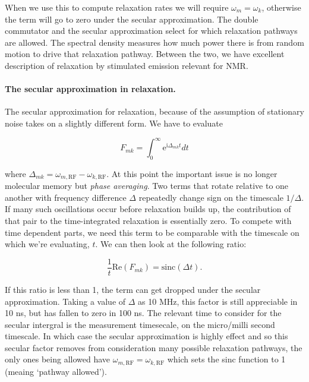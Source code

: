 \documentclass[notitlepage,11pt]{article}
\newcommand{\rmi}{\mathrm{i}}
\newcommand{\rme}{\mathrm{e}}
\begin{document}
When we use this to compute relaxation rates we will require $\omega_{m}= \omega_{k}$, otherwise the term will go to zero under the secular approximation. The double commutator and the secular approximation select for which relaxation pathways are allowed. The spectral density measures how much power there is from random motion to drive that relaxation pathway. Between the two, we have excellent description of relaxation by stimulated emission relevant for NMR.

\paragraph{The secular approximation in relaxation.}
The secular approximation for relaxation, because of the assumption of stationary noise takes on a slightly different form. We have to evaluate

\begin{equation}
F_{mk} = \int_0^\infty \rme^{\rmi \Delta_{mk} t}  dt 
\end{equation}

where $\Delta_{mk}=\omega_{m,\mathrm{RF}}- \omega_{k,\mathrm{RF}}$. At this point the important issue is no longer molecular memory but \emph{phase averaging}. Two terms that rotate relative to one another with frequency difference $\Delta$ repeatedly change sign on the timescale $1/\Delta$. If many such oscillations occur before relaxation builds up, the contribution of that pair to the time-integrated relaxation is essentially zero. To compete with time dependent parts, we need this term to be comparable with the timescale on which we're evaluating, $t$. We can then look at the following ratio:

\begin{equation}
\frac{1}{t}\mathrm{Re}\left(F_{mk}\right) =  \mathrm{sinc}(\Delta t).
\end{equation}

If this ratio is less than 1, the term can get dropped under the secular approximation. Taking a value of $\Delta$ as 10 MHz, this factor is still appreciable in 10 ns, but has fallen to zero in 100 ns. The relevant time to consider for the secular intergral is the measurement timesecale, on the micro/milli second timescale. In which case the secular approximation is highly effect and so this secular factor removes from consideration many possible relaxation pathways, the only ones being allowed have $\omega_{m,\mathrm{RF}}= \omega_{k,\mathrm{RF}}$ which sets the sinc function to 1 (meaing `pathway allowed').
\end{document}
